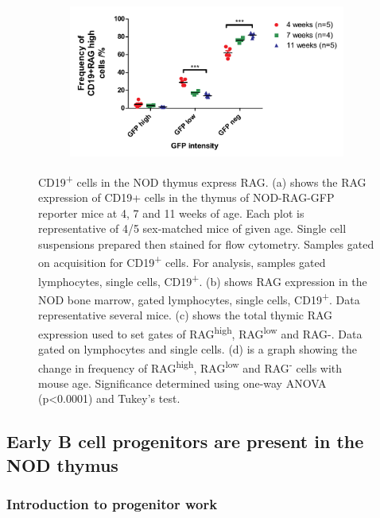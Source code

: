 \begin{figure}
\begin{subfigure}{0.5\textwidth}
	\caption{}
	\label{subfig:totalthyRAG}
	\end{subfigure}
	\begin{subfigure}{\textwidth}
	\includegraphics[width=\textwidth]{Figures/RAGhighlownegative.pdf}
	\caption{}
	\label{subfig:RAGhighlowneggraph}
	\end{subfigure}
\caption[Some CD19\textsuperscript{+} cells in the thymus appear to be expressing RAG]{CD19\textsuperscript{+} cells in the NOD thymus express RAG. 
(a) shows the RAG expression of CD19+ cells in the thymus of NOD-RAG-GFP reporter mice at 4, 7 and 11 weeks of age. Each plot is representative of 4/5 sex-matched mice of given age. Single cell suspensions prepared then stained for flow cytometry. Samples gated on acquisition for CD19\textsuperscript{+} cells. For analysis, samples gated lymphocytes, single cells, CD19\textsuperscript{+}. (b) shows RAG expression in the NOD bone marrow, gated lymphocytes, single cells, CD19\textsuperscript{+}. Data representative several mice. (c) shows the total thymic RAG expression used to set gates of RAG\textsuperscript{high}, RAG\textsuperscript{low} and RAG-. Data gated on lymphocytes and single cells. (d) is a graph showing the change in frequency of RAG\textsuperscript{high}, RAG\textsuperscript{low} and RAG\textsuperscript{-} cells with mouse age. Significance determined using one-way ANOVA (p<0.0001) and Tukey's test.} 
\end{figure}



\subsection{Early B cell progenitors are present in the NOD thymus}
\label{subsec:earlyprogens}

\subsubsection{Introduction to progenitor work}

